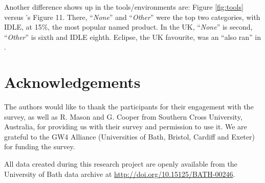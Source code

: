 \documentclass[a4paper,11pt]{article}
\begin{document}
Another difference shows up in the tools/environments are: Figure
\ref{fig:tools} versus \cite{mason+cooper:2014}'s Figure 11. There,
``{\emph{None}}'' and ``{\emph{Other}}'' were the top two categories,
with IDLE, at 15\%, the most popular named product. In the UK,
``{\emph{None}}'' is second, ``{\emph{Other}}'' is sixth and IDLE
eighth. Eclipse, the UK favourite, was an ``also ran'' in
\cite{mason+cooper:2014}.

\section{Acknowledgements}

The authors would like to thank the participants for their engagement
with the survey, as well as R. Mason and G. Cooper from Southern Cross
University, Australia, for providing us with their survey and
permission to use it. We are grateful to the GW4 Alliance
(Universities of Bath, Bristol, Cardiff and Exeter) for funding the
survey.

All data created during this research project are openly available
from the University of Bath data archive at
\url{http://doi.org/10.15125/BATH-00246}.



\end{document}
